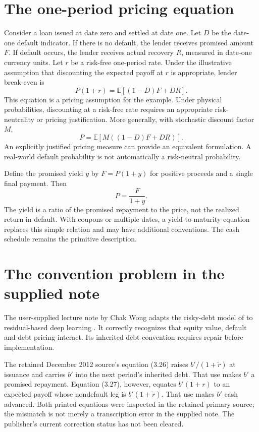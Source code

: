 \section{The one-period pricing equation}
Consider a loan issued at date zero and settled at date one. Let $D$ be the date-one default indicator. If there is no default, the lender receives promised amount $F$. If default occurs, the lender receives actual recovery $R$, measured in date-one currency units. Let $r$ be a risk-free one-period rate. Under the illustrative assumption that discounting the expected payoff at $r$ is appropriate, lender break-even is
\begin{equation}
 P(1+r)=\mathbb E[(1-D)F+DR].
 \label{sim:debt-pricing}
\end{equation}
This equation is a pricing assumption for the example. Under physical probabilities, discounting at a risk-free rate requires an appropriate risk-neutrality or pricing justification. More generally, with stochastic discount factor $M$,
\begin{equation}
 P=\mathbb E[M((1-D)F+DR)].
 \label{sim:sdf-pricing}
\end{equation}
An explicitly justified pricing measure can provide an equivalent formulation. A real-world default probability is not automatically a risk-neutral probability.

Define the promised yield $y$ by $F=P(1+y)$ for positive proceeds and a single final payment. Then
\begin{equation}
 P=\frac{F}{1+y}.
 \label{sim:proceeds-face}
\end{equation}
The yield is a ratio of the promised repayment to the price, not the realized return in default. With coupons or multiple dates, a yield-to-maturity equation replaces this simple relation and may have additional conventions. The cash schedule remains the primitive description.

\section{The convention problem in the supplied note}
The user-supplied lecture note by Chak Wong adapts the risky-debt model of \citet[Section 3.6]{strebulaev2012} to residual-based deep learning \citep{user2026riskynote}. It correctly recognizes that equity value, default and debt pricing interact. Its inherited debt convention requires repair before implementation.

The retained December 2012 source's equation (3.26) raises $b'/(1+\widetilde r)$ at issuance and carries $b'$ into the next period's inherited debt. That use makes $b'$ a promised repayment. Equation (3.27), however, equates $b'(1+r)$ to an expected payoff whose nondefault leg is $b'(1+\widetilde r)$. That use makes $b'$ cash advanced. Both printed equations were inspected in the retained primary source; the mismatch is not merely a transcription error in the supplied note. The publisher's current correction status has not been cleared.

